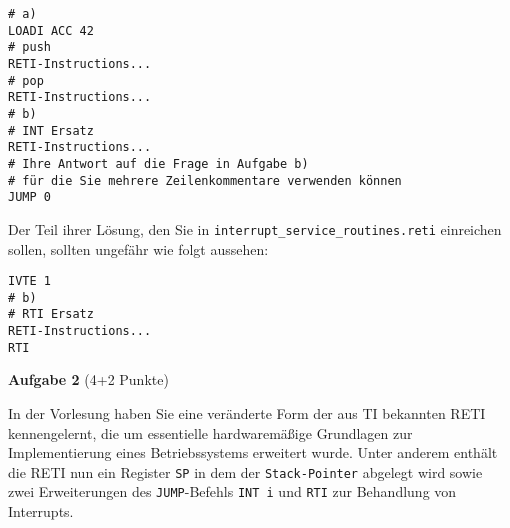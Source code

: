 \documentclass{article}
\newenvironment{adjustedminipage}[1]
  {\vspace{0.15cm}\begin{minipage}{#1}}
  {\end{minipage}}
\begin{document}
\begin{center}
	\begin{adjustedminipage}{0.9\textwidth}
		\begin{verbatim}
# a)
LOADI ACC 42
# push
RETI-Instructions...
# pop
RETI-Instructions...
# b)
# INT Ersatz
RETI-Instructions...
# Ihre Antwort auf die Frage in Aufgabe b)
# für die Sie mehrere Zeilenkommentare verwenden können
JUMP 0
    \end{verbatim}
	\end{adjustedminipage}
\end{center}

Der Teil ihrer Lösung, den Sie in \verb|interrupt_service_routines.reti| einreichen sollen, sollten ungefähr wie folgt aussehen:

\begin{center}
	\begin{adjustedminipage}{0.9\textwidth}
		\begin{verbatim}
IVTE 1
# b)
# RTI Ersatz
RETI-Instructions...
RTI
    \end{verbatim}
	\end{adjustedminipage}
\end{center}

\vspace{0.5cm}
\textbf{Aufgabe 2} (4+2 Punkte)
\vspace{0.5cm}

In der Vorlesung haben Sie eine veränderte Form der aus TI bekannten RETI kennengelernt, die um essentielle hardwaremäßige Grundlagen zur Implementierung eines Betriebssystems erweitert wurde. Unter anderem enthält die RETI nun ein Register \verb|SP| in dem der \verb|Stack-Pointer| abgelegt wird sowie zwei Erweiterungen des \verb|JUMP|-Befehls \verb|INT i| und \verb|RTI| zur Behandlung von Interrupts.
\end{document}
